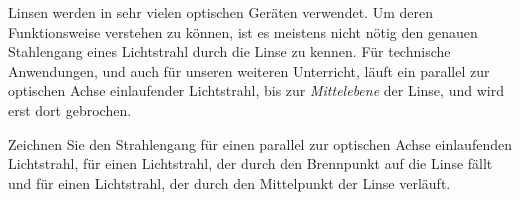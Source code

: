 \documentclass[12pt,a4paper,twoside]{article}
\begin{document}
\begin{center}
\end{center}


Linsen werden in sehr vielen optischen Geräten verwendet. Um deren Funktionsweise verstehen zu können, ist es meistens nicht
nötig den genauen Stahlengang eines Lichtstrahl durch die Linse zu kennen. Für technische Anwendungen, und auch für unseren weiteren
Unterricht, läuft ein parallel zur optischen Achse einlaufender Lichtstrahl, bis zur \emph{Mittelebene} der Linse, und wird erst dort gebrochen.

\begin{aufgabe}
	Zeichnen Sie den Strahlengang für einen parallel zur optischen Achse einlaufenden Lichtstrahl, für einen Lichtstrahl, der durch
	den Brennpunkt auf die Linse fällt und für einen Lichtstrahl, der durch den Mittelpunkt der Linse verläuft.
\end{aufgabe}

\begin{center}
\end{center}
\end{document}
